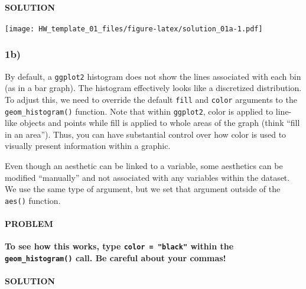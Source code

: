 \documentclass[]{article}
\newenvironment{Shaded}{\begin{snugshade}}{\end{snugshade}}
\newcommand{\DataTypeTok}[1]{\textcolor[rgb]{0.13,0.29,0.53}{#1}}
\newcommand{\DecValTok}[1]{\textcolor[rgb]{0.00,0.00,0.81}{#1}}
\newcommand{\KeywordTok}[1]{\textcolor[rgb]{0.13,0.29,0.53}{\textbf{#1}}}
\newcommand{\NormalTok}[1]{#1}
\newcommand{\OperatorTok}[1]{\textcolor[rgb]{0.81,0.36,0.00}{\textbf{#1}}}
\newcommand{\StringTok}[1]{\textcolor[rgb]{0.31,0.60,0.02}{#1}}
\let\oldparagraph\paragraph
\renewcommand{\paragraph}[1]{\oldparagraph{#1}\mbox{}}
\begin{document}
\hypertarget{solution}{%
\paragraph{SOLUTION}\label{solution}}

\begin{Shaded}
\end{Shaded}

\texttt{[image: HW\_template\_01\_files/figure-latex/solution\_01a-1.pdf]}

\hypertarget{b}{%
\subsubsection{1b)}\label{b}}

By default, a \texttt{ggplot2} histogram does not show the lines
associated with each bin (as in a bar graph). The histogram effectively
looks like a discretized distribution. To adjust this, we need to
override the default \texttt{fill} and \texttt{color} arguments to the
\texttt{geom\_histogram()} function. Note that within \texttt{ggplot2},
color is applied to line-like objects and points while fill is applied
to whole areas of the graph (think ``fill in an area''). Thus, you can
have substantial control over how color is used to visually present
information within a graphic.

Even though an aesthetic can be linked to a variable, some aesthetics
can be modified ``manually'' and not associated with any variables
within the dataset. We use the same type of argument, but we set that
argument outside of the \texttt{aes()} function.

\hypertarget{problem-2}{%
\paragraph{PROBLEM}\label{problem-2}}

\textbf{To see how this works, type \texttt{color\ =\ "black"} within
the \texttt{geom\_histogram()} call. Be careful about your commas!}

\hypertarget{solution-1}{%
\paragraph{SOLUTION}\label{solution-1}}
\end{document}
